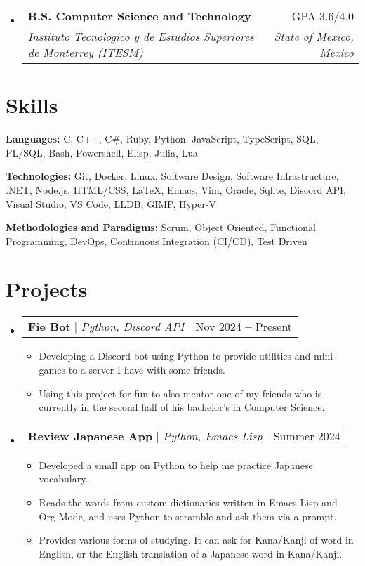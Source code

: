 \documentclass[letterpaper, 11pt]{article}
\makeatletter
\newcommand{\resumeSchoolHeading}[4]{
  \vspace{-5pt}\item
  \begin{tabular*}{0.97\textwidth}[t]{l@{\extracolsep{\fill}}r}
    \textbf{#1} & #2 \\
    \textit{\small#3} & \textit{\small#4}
  \end{tabular*}\vspace{-5pt}
}
\newcommand{\resumeProjectHeading}[3]{
  \vspace{-2pt}\item
  \begin{tabular*}{0.97\textwidth}{l@{\extracolsep{\fill}}r}
    \textbf{#1} $|$ \emph{#2} & #3
  \end{tabular*}\vspace{-9pt}
}
\newcommand{\resumeItem}[1]{
  \item\small{
    {#1 \vspace{-2pt}}
  }
}
\newcommand{\resumeSkillList}[2]{
  \textbf{#1:}{ #2 } \\ \vspace{1.5pt}
}
\makeatother
\begin{document}
\begin{itemize}[leftmargin=0.15in, label={}]
  \resumeSchoolHeading
      {B.S. Computer Science and Technology}{GPA 3.6/4.0}
      {Instituto Tecnologico y de Estudios Superiores de Monterrey (ITESM)}{State of Mexico, Mexico}
\end{itemize}


\section{Skills}
\vspace{1pt}

\begin{itemize}[leftmargin=0.15in, label={}]
  \small{\item{
    \resumeSkillList
      {Languages}{C, C++, C\#, Ruby, Python, JavaScript, TypeScript, SQL, PL/SQL, Bash, Powershell, Elisp, Julia, Lua}
    \resumeSkillList
      {Technologies}{Git, Docker, Linux, Software Design, Software Infrastructure, .NET, Node.js, HTML/CSS, LaTeX, Emacs, Vim, Oracle, Sqlite, Discord API, Visual Studio, VS Code, LLDB, GIMP, Hyper-V}
    \resumeSkillList
      {Methodologies and Paradigms}{Scrum, Object Oriented, Functional Programming, DevOps, Continuous Integration (CI/CD), Test Driven}
  }}
\end{itemize}


\section{Projects}
\vspace{1pt}
\begin{itemize}[leftmargin=0.15in, label={}]

  \resumeProjectHeading
    {Fie Bot}{Python, Discord API}{Nov 2024 \textbf{--} Present}

  \begin{itemize}
    \resumeItem{Developing a Discord bot using Python to provide utilities and mini-games to a server I have with some friends.}
    \resumeItem{Using this project for fun to also mentor one of my friends who is currently in the second half of his bachelor's in Computer Science.}
  \end{itemize}\vspace{-5pt}

  \resumeProjectHeading
    {Review Japanese App}{Python, Emacs Lisp}{Summer 2024}

    \begin{itemize}
      \resumeItem{Developed a small app on Python to help me practice Japanese vocabulary.}
      \resumeItem{Reads the words from custom dictionaries written in Emacs Lisp and Org-Mode, and uses Python to scramble and ask them via a prompt.}
      \resumeItem{Provides various forms of studying. It can ask for Kana/Kanji of word in English, or the English translation of a Japanese word in Kana/Kanji.}
    \end{itemize}\vspace{-5pt}
\end{itemize}
\end{document}

